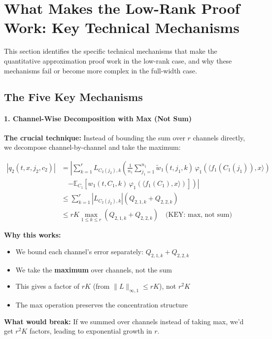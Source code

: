 \section{What Makes the Low-Rank Proof Work: Key Technical Mechanisms}
\label{sec:what-makes-proof-work}

This section identifies the specific technical mechanisms that make the quantitative approximation proof work in the low-rank case, and why these mechanisms fail or become more complex in the full-width case.

\subsection{The Five Key Mechanisms}

\paragraph*{1. Channel-Wise Decomposition with Max (Not Sum)}

\textbf{The crucial technique:} Instead of bounding the sum over $r$ channels directly, we decompose channel-by-channel and take the maximum:

\begin{align*}
|q_2(t, x, j_2, c_2)| &= \left|\sum_{k=1}^r L_{C_2(j_2),k}\left(\frac{1}{n_1}\sum_{j_1=1}^{n_1}\tilde{w}_1(t, j_1, k)\,\varphi_1(\langle f_1(C_1(j_1)), x\rangle)\right.\right.\\
&\quad\left.\left. - \mathbb{E}_{C_1}[w_1(t, C_1, k)\,\varphi_1(\langle f_1(C_1), x\rangle)]\right)\right|\\
&\le \sum_{k=1}^r |L_{C_2(j_2),k}|(Q_{2,1,k} + Q_{2,2,k})\\
&\le rK \max_{1 \le k \le r}(Q_{2,1,k} + Q_{2,2,k}) \quad \text{(KEY: max, not sum)}
\end{align*}

\textbf{Why this works:}
\begin{itemize}
\item We bound each channel's error separately: $Q_{2,1,k} + Q_{2,2,k}$
\item We take the \textbf{maximum} over channels, not the sum
\item This gives a factor of $rK$ (from $\|L\|_{\infty,1} \le rK$), not $r^2K$
\item The max operation preserves the concentration structure
\end{itemize}

\textbf{What would break:} If we summed over channels instead of taking max, we'd get $r^2K$ factors, leading to exponential growth in $r$.

